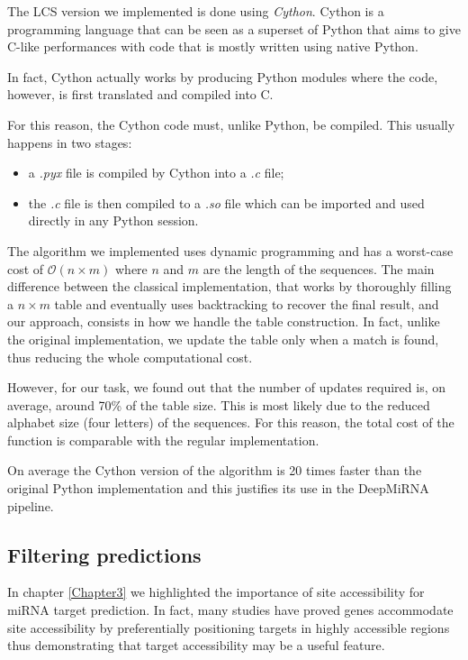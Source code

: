 The LCS version we implemented is done using \emph{Cython}\cite{cython}. Cython is a programming language that can be seen as a superset of Python that aims to give C-like performances with code that is mostly written using native Python. 

In fact, Cython actually works by producing Python modules where the code, however, is first translated and compiled into C.

For this reason, the Cython code must, unlike Python, be compiled. This usually happens in two stages: 

\begin{itemize}
	\item a \emph{.pyx} file is compiled by Cython into a \emph{.c} file;
	\item the \emph{.c} file is then compiled to a \emph{.so} file which can be imported and used directly in any Python session. 
\end{itemize}   

The algorithm we implemented uses dynamic programming and has a worst-case cost of $\mathcal{O}(n \times m)$ where $n$ and $m$ are the length of the sequences. The main difference between the classical implementation, that works by thoroughly filling a $n \times m$ table and eventually uses  backtracking to recover the final result, and our approach, consists in how we handle the table construction. In fact, unlike the original implementation, we update the table only when a match is found, thus reducing the whole computational cost. 

However, for our task, we found out that the number of updates required is, on average, around 70\% of the table size. This is most likely due to the reduced alphabet size (four letters) of the sequences. For this reason, the total cost of the function is comparable with the regular implementation.

On average the Cython version of the algorithm is 20 times faster than the original Python implementation and this justifies its use in the DeepMiRNA pipeline.

      

\subsection{Filtering predictions} \label{sub:filtering_step}
In chapter \ref{Chapter3} we highlighted the importance of site accessibility for miRNA target prediction. In fact, many studies \cite{helwak} \cite{common_features} have proved genes accommodate site accessibility by preferentially positioning targets in highly accessible regions \cite{accessibility_nrg_role} thus demonstrating that target accessibility may be a useful feature.

